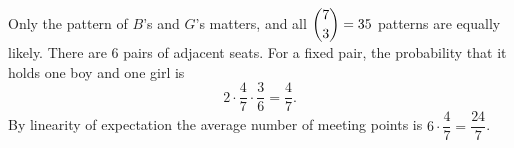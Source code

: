 Only the pattern of $B$'s and $G$'s matters, and all $\dbinom73=35$ patterns are equally likely. There are $6$ pairs of adjacent seats. For a fixed pair, the probability that it holds one boy and one girl is
\[
2\cdot\dfrac{4}{7}\cdot\dfrac{3}{6}=\dfrac{4}{7} .
\]
By linearity of expectation the average number of meeting points is $6\cdot\dfrac{4}{7}=\boxed{\dfrac{24}{7}}$.
